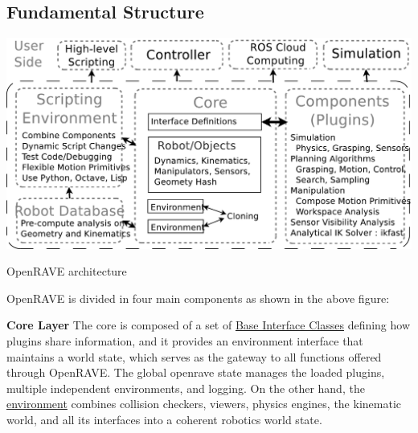 \hypertarget{architecture__concepts_fundamental_structure}{}\subsection{Fundamental Structure}\label{architecture__concepts_fundamental_structure}



\begin{DoxyImage}
\includegraphics[width=15cm]{openrave_architecture}
\caption{OpenRAVE architecture}
\end{DoxyImage}


OpenRAVE is divided in four main components as shown in the above figure:


\begin{DoxyItemize}
\item {\bfseries Core Layer} The core is composed of a set of \hyperlink{group__interfaces}{Base Interface Classes} defining how plugins share information, and it provides an environment interface that maintains a world state, which serves as the gateway to all functions offered through OpenRAVE. The global openrave state manages the loaded plugins, multiple independent environments, and logging. On the other hand, the \hyperlink{classOpenRAVE_1_1EnvironmentBase}{environment} combines collision checkers, viewers, physics engines, the kinematic world, and all its interfaces into a coherent robotics world state.
\end{DoxyItemize}


